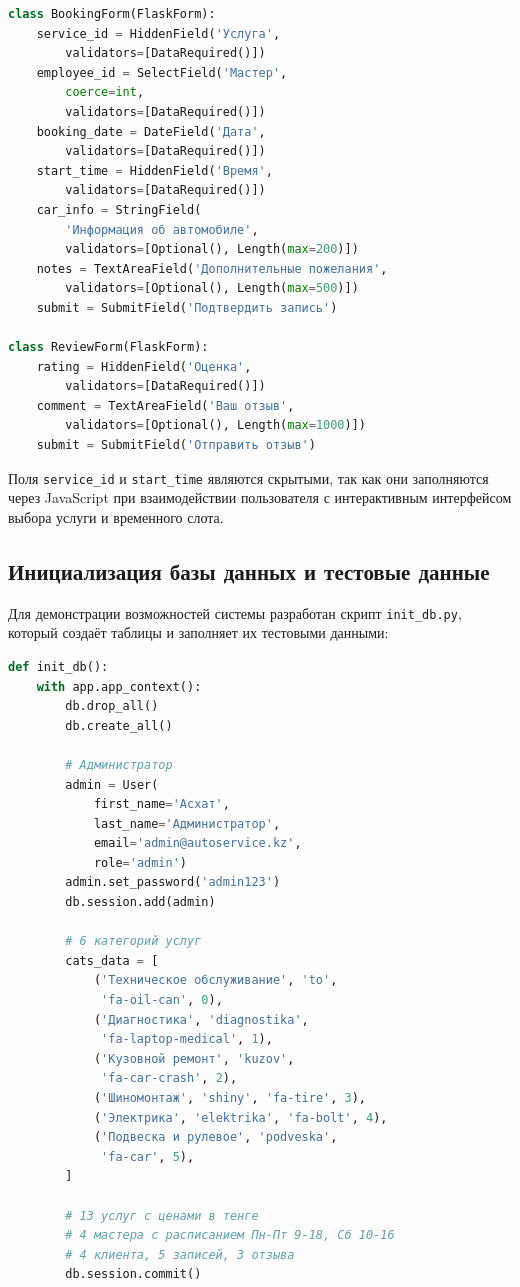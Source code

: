 \documentclass[14pt,a4paper,oneside]{extarticle}
\begin{document}
\begin{lstlisting}[language=Python, caption={Форма записи (client/forms.py)}, label={lst:booking_form}]
class BookingForm(FlaskForm):
    service_id = HiddenField('Услуга',
        validators=[DataRequired()])
    employee_id = SelectField('Мастер',
        coerce=int,
        validators=[DataRequired()])
    booking_date = DateField('Дата',
        validators=[DataRequired()])
    start_time = HiddenField('Время',
        validators=[DataRequired()])
    car_info = StringField(
        'Информация об автомобиле',
        validators=[Optional(), Length(max=200)])
    notes = TextAreaField('Дополнительные пожелания',
        validators=[Optional(), Length(max=500)])
    submit = SubmitField('Подтвердить запись')

class ReviewForm(FlaskForm):
    rating = HiddenField('Оценка',
        validators=[DataRequired()])
    comment = TextAreaField('Ваш отзыв',
        validators=[Optional(), Length(max=1000)])
    submit = SubmitField('Отправить отзыв')
\end{lstlisting}

Поля \texttt{service\_id} и \texttt{start\_time} являются скрытыми, так как они заполняются через JavaScript при взаимодействии пользователя с интерактивным интерфейсом выбора услуги и временного слота.

\subsection{Инициализация базы данных и тестовые данные}

Для демонстрации возможностей системы разработан скрипт \texttt{init\_db.py}, который создаёт таблицы и заполняет их тестовыми данными:

\begin{lstlisting}[language=Python, caption={Инициализация БД с тестовыми данными (фрагмент init\_db.py)}, label={lst:initdb}]
def init_db():
    with app.app_context():
        db.drop_all()
        db.create_all()

        # Администратор
        admin = User(
            first_name='Асхат',
            last_name='Администратор',
            email='admin@autoservice.kz',
            role='admin')
        admin.set_password('admin123')
        db.session.add(admin)

        # 6 категорий услуг
        cats_data = [
            ('Техническое обслуживание', 'to',
             'fa-oil-can', 0),
            ('Диагностика', 'diagnostika',
             'fa-laptop-medical', 1),
            ('Кузовной ремонт', 'kuzov',
             'fa-car-crash', 2),
            ('Шиномонтаж', 'shiny', 'fa-tire', 3),
            ('Электрика', 'elektrika', 'fa-bolt', 4),
            ('Подвеска и рулевое', 'podveska',
             'fa-car', 5),
        ]

        # 13 услуг с ценами в тенге
        # 4 мастера с расписанием Пн-Пт 9-18, Сб 10-16
        # 4 клиента, 5 записей, 3 отзыва
        db.session.commit()
\end{lstlisting}
\end{document}
